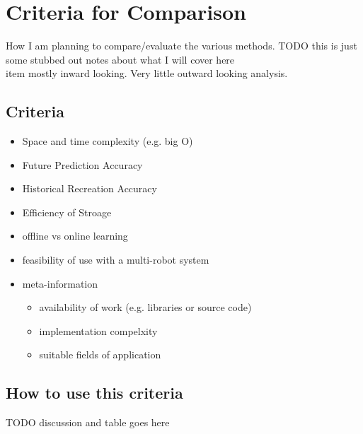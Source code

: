 \chapter{Criteria for Comparison}
How I am planning to compare/evaluate the various methods.
TODO this is just some stubbed out notes about what I will cover here \\
item mostly inward looking. Very little outward looking analysis.


\section{ Criteria }
\begin{itemize}
  \item Space and time complexity (e.g. big O)
  \item Future Prediction Accuracy
  \item Historical Recreation Accuracy
  \item Efficiency of Stroage
  \item offline vs online learning
  \item feasibility of use with a multi-robot system

  \item meta-information
  \begin{itemize}
    \item availability of work (e.g. libraries or source code)
    \item implementation compelxity
    \item suitable fields of application
  \end{itemize}
\end{itemize}



\section{ How to use this criteria }
TODO discussion and table goes here
